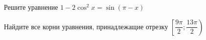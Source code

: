 \begin{ex}
	\begin{condition}
		\begin{enumcols}[label=\asbuk*)]
			\item Решите уравнение \( 1 -2\cos^2 x  = \sin {\left(\pi-x\right)} \)
			\item Найдите все корни уравнения, принадлежащие отрезку \( \left[\dfrac{9\pi}{2};\dfrac{13\pi}{2}\right) \)
		\end{enumcols}
	\end{condition}
\end{ex}